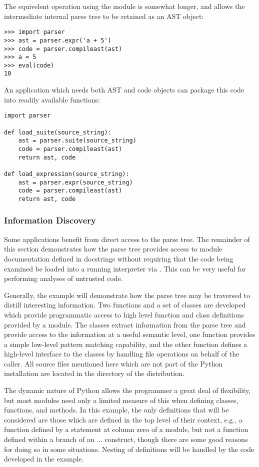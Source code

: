 The equivelent operation using the  module is somewhat
longer, and allows the intermediate internal parse tree to be retained
as an AST object:

\begin{verbatim}
>>> import parser
>>> ast = parser.expr('a + 5')
>>> code = parser.compileast(ast)
>>> a = 5
>>> eval(code)
10
\end{verbatim}

An application which needs both AST and code objects can package this
code into readily available functions:

\begin{verbatim}
import parser

def load_suite(source_string):
    ast = parser.suite(source_string)
    code = parser.compileast(ast)
    return ast, code

def load_expression(source_string):
    ast = parser.expr(source_string)
    code = parser.compileast(ast)
    return ast, code
\end{verbatim}

\subsubsection{Information Discovery}

Some applications benefit from direct access to the parse tree.  The
remainder of this section demonstrates how the parse tree provides
access to module documentation defined in docstrings without requiring
that the code being examined be loaded into a running interpreter via
.  This can be very useful for performing analyses of
untrusted code.

Generally, the example will demonstrate how the parse tree may be
traversed to distill interesting information.  Two functions and a set
of classes are developed which provide programmatic access to high
level function and class definitions provided by a module.  The
classes extract information from the parse tree and provide access to
the information at a useful semantic level, one function provides a
simple low-level pattern matching capability, and the other function
defines a high-level interface to the classes by handling file
operations on behalf of the caller.  All source files mentioned here
which are not part of the Python installation are located in the
 directory of the distribution.

The dynamic nature of Python allows the programmer a great deal of
flexibility, but most modules need only a limited measure of this when
defining classes, functions, and methods.  In this example, the only
definitions that will be considered are those which are defined in the
top level of their context, e.g., a function defined by a 
statement at column zero of a module, but not a function defined
within a branch of an  ...  construct, though
there are some good reasons for doing so in some situations.  Nesting
of definitions will be handled by the code developed in the example.

